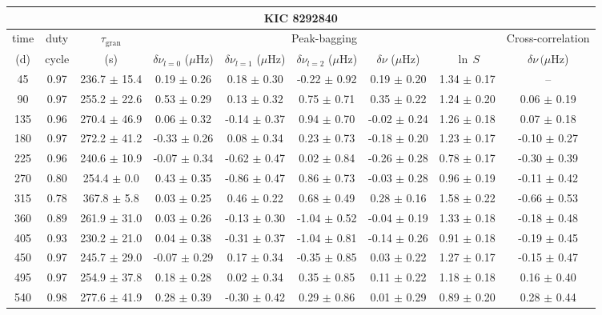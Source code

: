 \documentclass[twocolumn]{aastex61}%
\begin{document}
\begin{table*}[ht]\centering\fontsize{9.}{7.}\selectfont
\begin{tabular}{ccc|ccccc|c}
\multicolumn{9}{c}{KIC 8292840}\\ \hline\hline
time & duty & $\tau_\text{gran}$ &\multicolumn{5}{c|}{Peak-bagging}&Cross-correlation\\
(d)& cycle & (s)&$\delta\nu_{l=0}$ ($\mu$Hz) & $\delta\nu_{l=1}$ ($\mu$Hz) & $\delta\nu_{l=2}$ ($\mu$Hz) & $\delta\nu$ ($\mu$Hz)& $\ln\,S$ & $\delta\nu\,(\mu$Hz)\\\hline
45 & 0.97 & 236.7 $\pm$ 15.4 & 0.19 $\pm$ 0.26 & 0.18 $\pm$ 0.30 & -0.22 $\pm$ 0.92 & 0.19 $\pm$ 0.20 & 1.34 $\pm$ 0.17 & --\\
90 & 0.97 & 255.2 $\pm$ 22.6 & 0.53 $\pm$ 0.29 & 0.13 $\pm$ 0.32 & 0.75 $\pm$ 0.71 & 0.35 $\pm$ 0.22 & 1.24 $\pm$ 0.20 & 0.06 $\pm$ 0.19\\
135 & 0.96 & 270.4 $\pm$ 46.9 & 0.06 $\pm$ 0.32 & -0.14 $\pm$ 0.37 & 0.94 $\pm$ 0.70 & -0.02 $\pm$ 0.24 & 1.26 $\pm$ 0.18 & 0.07 $\pm$ 0.18\\
180 & 0.97 & 272.2 $\pm$ 41.2 & -0.33 $\pm$ 0.26 & 0.08 $\pm$ 0.34 & 0.23 $\pm$ 0.73 & -0.18 $\pm$ 0.20 & 1.23 $\pm$ 0.17 & -0.10 $\pm$ 0.27\\
225 & 0.96 & 240.6 $\pm$ 10.9 & -0.07 $\pm$ 0.34 & -0.62 $\pm$ 0.47 & 0.02 $\pm$ 0.84 & -0.26 $\pm$ 0.28 & 0.78 $\pm$ 0.17 & -0.30 $\pm$ 0.39\\
270 & 0.80 & 254.4 $\pm$ 0.0 & 0.43 $\pm$ 0.35 & -0.86 $\pm$ 0.47 & 0.86 $\pm$ 0.73 & -0.03 $\pm$ 0.28 & 0.96 $\pm$ 0.19 & -0.11 $\pm$ 0.42\\
315 & 0.78 & 367.8 $\pm$ 5.8 & 0.03 $\pm$ 0.25 & 0.46 $\pm$ 0.22 & 0.68 $\pm$ 0.49 & 0.28 $\pm$ 0.16 & 1.58 $\pm$ 0.22 & -0.66 $\pm$ 0.53\\
360 & 0.89 & 261.9 $\pm$ 31.0 & 0.03 $\pm$ 0.26 & -0.13 $\pm$ 0.30 & -1.04 $\pm$ 0.52 & -0.04 $\pm$ 0.19 & 1.33 $\pm$ 0.18 & -0.18 $\pm$ 0.48\\
405 & 0.93 & 230.2 $\pm$ 21.0 & 0.04 $\pm$ 0.38 & -0.31 $\pm$ 0.37 & -1.04 $\pm$ 0.81 & -0.14 $\pm$ 0.26 & 0.91 $\pm$ 0.18 & -0.19 $\pm$ 0.45\\
450 & 0.97 & 245.7 $\pm$ 29.0 & -0.07 $\pm$ 0.29 & 0.17 $\pm$ 0.34 & -0.35 $\pm$ 0.85 & 0.03 $\pm$ 0.22 & 1.27 $\pm$ 0.17 & -0.15 $\pm$ 0.47\\
495 & 0.97 & 254.9 $\pm$ 37.8 & 0.18 $\pm$ 0.28 & 0.02 $\pm$ 0.34 & 0.35 $\pm$ 0.85 & 0.11 $\pm$ 0.22 & 1.18 $\pm$ 0.18 & 0.16 $\pm$ 0.40\\
540 & 0.98 & 277.6 $\pm$ 41.9 & 0.28 $\pm$ 0.39 & -0.30 $\pm$ 0.42 & 0.29 $\pm$ 0.86 & 0.01 $\pm$ 0.29 & 0.89 $\pm$ 0.20 & 0.28 $\pm$ 0.44\\

\end{tabular}
\end{table*}
\end{document}
